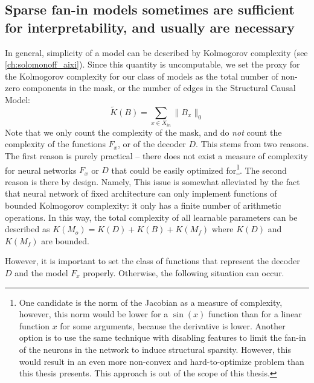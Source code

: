 \documentclass[a4paper,11pt,oneside]{report}
\begin{document}
\subsection{Sparse fan-in models sometimes are sufficient for interpretability, and usually are necessary}
In general, simplicity of a model can be described by Kolmogorov complexity (see \autoref{ch:solomonoff_aixi}). Since this quantity is uncomputable, we set the proxy for the Kolmogorov complexity for our class of models as the total number of non-zero components in the mask, or the number of edges in the Structural Causal Model:
$$
\tilde{K}(B)=\sum\limits_{x\in X_{in}}\|B_x\|_0
$$
Note that we only count the complexity of the mask, and do {\em not} count the complexity of the functions $F_x$, or of the decoder $D$. This stems from two reasons. The first reason is purely practical -- there does not exist a measure of complexity for neural networks $F_x$ or $D$ that could be easily optimized for\footnote{One candidate is the norm of the Jacobian as a measure of complexity, however, this norm would be lower for a $\sin(x)$ function than for a linear function $x$ for some arguments, because the derivative is lower. Another option is to use the same technique with disabling features \cite{Oisy2019} to limit the fan-in of the neurons in the network to induce structural sparsity. However, this would result in an even more non-convex and hard-to-optimize problem than this thesis presents. This approach is out of the scope of this thesis.}. The second reason is there by design. Namely,
This issue is somewhat alleviated by the fact that neural network of fixed architecture can only implement functions of bounded Kolmogorov complexity: it only has a finite number of arithmetic operations. In this way, the total complexity of all learnable parameters can be described as $K(M_o)=K(D)+K(B)+K(M_f)$ where $K(D)$ and $K(M_f)$ are bounded.

However, it is important to set the class of functions that represent the decoder $D$ and the model $F_x$ properly. Otherwise, the following situation can occur.
\end{document}
